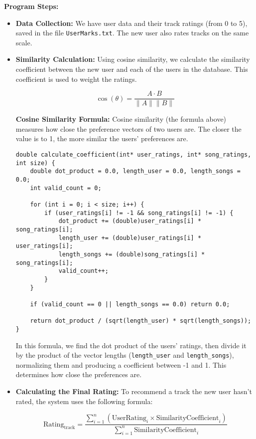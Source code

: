 \documentclass[12pt,a4paper]{article}
\begin{document}
\textbf{Program Steps:}
\begin{itemize}
    \item \textbf{Data Collection:} We have user data and their track ratings (from 0 to 5), saved in the file \texttt{UserMarks.txt}. The new user also rates tracks on the same scale.
    
    \item \textbf{Similarity Calculation:} Using cosine similarity, we calculate the similarity coefficient between the new user and each of the users in the database. This coefficient is used to weight the ratings.

    \[
    \cos(\theta) = \frac{A \cdot B}{\|A\| \|B\|}
    \]

    \textbf{Cosine Similarity Formula:} Cosine similarity (the formula above) measures how close the preference vectors of two users are. The closer the value is to 1, the more similar the users’ preferences are.
\begin{lstlisting}
double calculate_coefficient(int* user_ratings, int* song_ratings, int size) {
    double dot_product = 0.0, length_user = 0.0, length_songs = 0.0;
    int valid_count = 0;

    for (int i = 0; i < size; i++) {
        if (user_ratings[i] != -1 && song_ratings[i] != -1) {
            dot_product += (double)user_ratings[i] * song_ratings[i];
            length_user += (double)user_ratings[i] * user_ratings[i];
            length_songs += (double)song_ratings[i] * song_ratings[i];
            valid_count++;
        }
    }

    if (valid_count == 0 || length_songs == 0.0) return 0.0;

    return dot_product / (sqrt(length_user) * sqrt(length_songs));
}
\end{lstlisting}

    In this formula, we find the dot product of the users' ratings, then divide it by the product of the vector lengths (\texttt{length\_user} and \texttt{length\_songs}), normalizing them and producing a coefficient between -1 and 1. This determines how close the preferences are.

    \item \textbf{Calculating the Final Rating:} To recommend a track the new user hasn’t rated, the system uses the following formula:

    \[
    \text{Rating}_{\text{track}} = \frac{\sum_{i=1}^n (\text{UserRating}_i \times \text{SimilarityCoefficient}_i)}{\sum_{i=1}^n \text{SimilarityCoefficient}_i}
    \]


\end{itemize}
\end{document}
